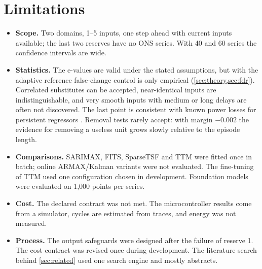 \documentclass[11pt]{article}
\theoremstyle{remark}
\begin{document}
\section{Limitations}\label{sec:limits}
\begin{itemize}
  \item \textbf{Scope.} Two domains, 1--5 inputs, one step ahead with current inputs available; the last two reserves have no ONS series. With 40 and 60 series the confidence intervals are wide.
  \item \textbf{Statistics.} The e-values are valid under the stated assumptions, but with the adaptive reference false-change control is only empirical (\cref{sec:theory,sec:fdr}). Correlated substitutes can be accepted, near-identical inputs are indistinguishable, and very smooth inputs with medium or long delays are often not discovered. The last point is consistent with known power losses for persistent regressors \citep{stambaugh1999,campbell2006}. Removal tests rarely accept: with margin $-0.002$ the evidence for removing a useless unit grows slowly relative to the episode length.
  \item \textbf{Comparisons.} SARIMAX, FITS, SparseTSF and TTM were fitted once in batch; online ARMAX/Kalman variants were not evaluated. The fine-tuning of TTM used one configuration chosen in development. Foundation models were evaluated on 1{,}000 points per series.
  \item \textbf{Cost.} The declared contract was not met. The microcontroller results come from a simulator, cycles are estimated from traces, and energy was not measured.
  \item \textbf{Process.} The output safeguards were designed after the failure of reserve 1. The cost contract was revised once during development. The literature search behind \cref{sec:related} used one search engine and mostly abstracts.
\end{itemize}
\end{document}
